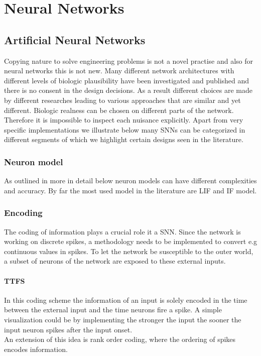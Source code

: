 \section{Neural Networks}

\subsection{Artificial Neural Networks}


Copying nature to solve engineering problems is not a novel practise and also for neural networks this is not new. Many different network architectures with different levels of biologic plausibility have been investigated and published and there is no consent in the design decisions. As a result different choices are made by different researches leading to various approaches that are similar and yet different. Biologic realness can be chosen on different parts of the network. Therefore it is impossible to inspect each nuisance explicitly. Apart from very specific implementations we illustrate below many \acp{SNN} can be categorized in different segments of which we highlight certain designs seen in the literature.\\

\subsubsection{Neuron model}
	As outlined in more in detail below neuron models can have different complexities and accuracy. By far the most used model in the literature are \ac{LIF} and \ac{IF} model.
\subsubsection{Encoding}
	The coding of information plays a crucial role it a \ac{SNN}. Since the network is working on discrete spikes, a methodology needs to be implemented to convert e.g continuous values in spikes. To let the network be susceptible to the outer world, a subset of neurons of the network are exposed to these external inputs.\\
	\paragraph{\ac{TTFS}}
	In this coding scheme the information of an input is solely encoded in the time between the external input and the time neurons fire a spike. A simple visualization could be by implementing the stronger the input the sooner the input neuron spikes after the input onset.\\
	An extension of this idea is rank order coding, where the ordering of spikes encodes information\cite{thorpe_spike-based_2001}.\\

